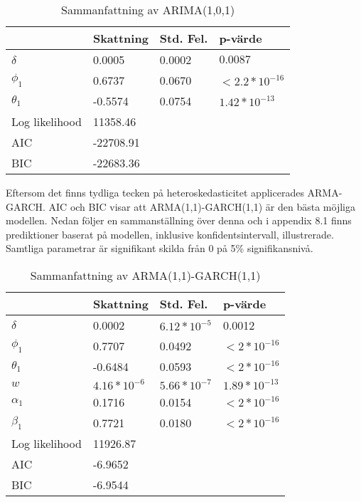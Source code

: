 \documentclass[11pt]{article}
\begin{document}
\begin{table}[H]
\centering
\caption{Sammanfattning av ARIMA(1,0,1)}
\begin{tabular}{||llll||}
\hline
              & \textbf{Skattning}  & \textbf{Std. Fel.} & \textbf{p-värde}          \\
              \hline \hline
$\delta$     & 0.0005    & 0.0002    & $0.0087$         \\
$\phi_1$      & 0.6737    & 0.0670    & $<2.2*10^{-16}$  \\
$\theta_1$    & -0.5574   & 0.0754    & $1.42*10^{-13}$  \\ 
\hline \hline
Log likelihood & 11358.46  &           &                  \\
AIC           & -22708.91 &           &                  \\
BIC           & -22683.36 &           &     \\
\hline
\end{tabular}
\end{table}

Eftersom det finns tydliga tecken på heteroskedasticitet applicerades ARMA-GARCH. AIC och BIC visar att ARMA(1,1)-GARCH(1,1) är den bästa möjliga modellen. Nedan följer en sammanställning över denna och i appendix 8.1 finns prediktioner baserat på modellen, inklusive konfidentsintervall, illustrerade. Samtliga parametrar är signifikant skilda från 0 på 5\% signifikansnivå.

\begin{table}[H]
\centering
\caption{Sammanfattning av ARMA(1,1)-GARCH(1,1)}
\begin{tabular}{||llll||}
\hline
              & \textbf{Skattning}  & \textbf{Std. Fel.} & \textbf{p-värde}          \\
              \hline \hline
$\delta$      & 0.0002         & $6.12*10^{-5}$ & 0.0012           \\
$\phi_1$      & 0.7707         & 0.0492         & $<2*10^{-16}$    \\
$\theta_1$    & -0.6484        & 0.0593         & $<2*10^{-16}$    \\
$w$           & $4.16*10^{-6}$ & $5.66*10^{-7}$ & $1.89*10^{-13}$  \\
$\alpha_1$    & 0.1716         & 0.0154         & $<2*10^{-16}$    \\
$\beta_1$     & 0.7721         & 0.0180         & $<2*10^{-16}$    \\ 
\hline \hline
Log likelihood & 11926.87       &                &                  \\
AIC           & -6.9652        &                &                  \\
BIC           & -6.9544        &                &          \\
\hline
\end{tabular}
\end{table}
\end{document}
